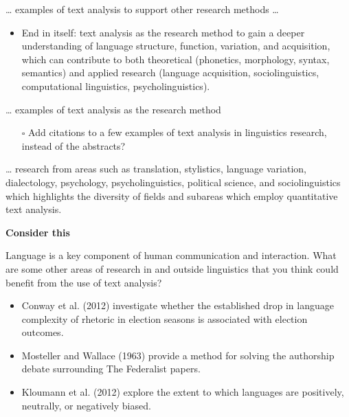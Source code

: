 \documentclass[
  letterpaper,
]{latex/krantz}
\providecommand{\tightlist}{%
  \setlength{\itemsep}{0pt}\setlength{\parskip}{0pt}}\usepackage{longtable,booktabs,array}
\begin{document}
\ldots{} examples of text analysis to support other research methods
\ldots{}

\begin{itemize}
\tightlist
\item
  End in itself: text analysis as the research method to gain a deeper
  understanding of language structure, function, variation, and
  acquisition, which can contribute to both theoretical (phonetics,
  morphology, syntax, semantics) and applied research (language
  acquisition, sociolinguistics, computational linguistics,
  psycholinguistics).
\end{itemize}

\ldots{} examples of text analysis as the research method

\begin{itemize}
\tightlist
\item[$\square$]
  Add citations to a few examples of text analysis in linguistics
  research, instead of the abstracts?
\end{itemize}

\ldots{} research from areas such as translation, stylistics, language
variation, dialectology, psychology, psycholinguistics, political
science, and sociolinguistics which highlights the diversity of fields
and subareas which employ quantitative text analysis.

\begin{tcolorbox}[enhanced jigsaw, arc=.35mm, leftrule=.75mm, rightrule=.15mm, opacityback=0, colback=white, breakable, bottomrule=.15mm, left=2mm, toprule=.15mm]

\textbf{ Consider this}

Language is a key component of human communication and interaction. What
are some other areas of research in and outside linguistics that you
think could benefit from the use of text analysis?

\begin{itemize}
\tightlist
\item
  Conway et al. (2012) investigate whether the established drop in
  language complexity of rhetoric in election seasons is associated with
  election outcomes.
\end{itemize}

\begin{itemize}
\tightlist
\item
  Mosteller and Wallace (1963) provide a method for solving the
  authorship debate surrounding The Federalist papers.
\end{itemize}

\begin{itemize}
\tightlist
\item
  Kloumann et al. (2012) explore the extent to which languages are
  positively, neutrally, or negatively biased.
\end{itemize}

\end{tcolorbox}
\end{document}

